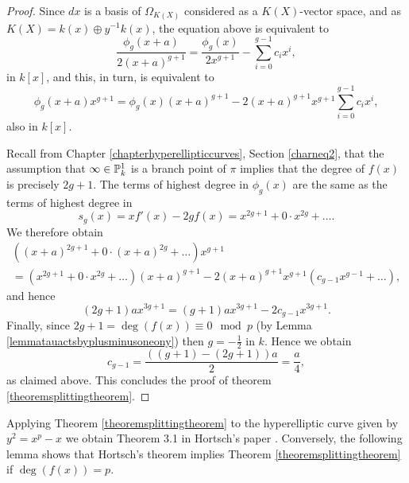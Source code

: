 \begin{proof}
    Since $dx$ is a basis of $\Omega_{K(X)}$ considered as a $K(X)$-vector space, and as $K(X) = k(x) \oplus y^{-1}k(x)$, the equation above is equivalent to
        \[
        \frac{\phi_g(x+a)}{2(x+a)^{g+1}} = \frac{\phi_g(x)}{2x^{g+1}} - \sum_{i=0}^{g-1} c_i x^i,
        \]
    in $k[x]$, and this, in turn, is equivalent to
        \[
        \phi_g(x+a)x^{g+1} = \phi_g(x)(x+a)^{g+1} - 2(x+a)^{g+1}x^{g+1}\sum_{i=0}^{g-1}c_i x^i,
        \]
    also in $k[x]$.

    Recall from Chapter \ref{chapterhyperellipticcurves}, Section \ref{charneq2}, that the assumption that $\infty \in {\mathbb P}_k^1$ is a branch point of $\pi$ implies that the degree of $f(x)$ is precisely $2g+1$.
    The terms of highest degree in $\phi_g(x)$ are the same as the terms of highest degree in 
        \[
        s_g(x) = xf'(x) - 2gf(x) = x^{2g+1} + 0\cdot x^{2g} + \ldots.
        \]
    We therefore obtain
        \begin{multline*}
        \left( (x+a)^{2g+1} + 0 \cdot (x+a)^{2g} + \ldots \right) x^{g+1}  \\ = (x^{2g+1} + 0 \cdot x^{2g} + \ldots )(x+a)^{g+1} - 2(x+a)^{g+1}x^{g+1}(c_{g-1}x^{g-1} + \ldots ),
        \end{multline*}
    and hence
        \[
        (2g+1)ax^{3g+1} = (g+1)ax^{3g+1} - 2c_{g-1}x^{3g+1}.
        \]
    Finally, since $2g + 1= \deg(f(x)) \equiv 0 \mod p$ (by Lemma \ref{lemmatauactsbyplusminusoneony}) then $g = -\frac{1}{2}$ in $k$.
    Hence we obtain
        \[
        c_{g-1} = \frac{((g+1) - (2g+1))a}{2} = \frac{a}{4},
        \]  
    as claimed above.
    This concludes the proof of theorem \ref{theoremsplittingtheorem}.
    \end{proof}

Applying Theorem \ref{theoremsplittingtheorem} to the hyperelliptic curve given by $y^2 = x^p - x$ we obtain Theorem 3.1 in Hortsch's paper \cite{canonicalrepresentation}. 
Conversely, the following lemma shows that Hortsch's theorem implies Theorem \ref{theoremsplittingtheorem} if $\deg(f(x)) = p$.

